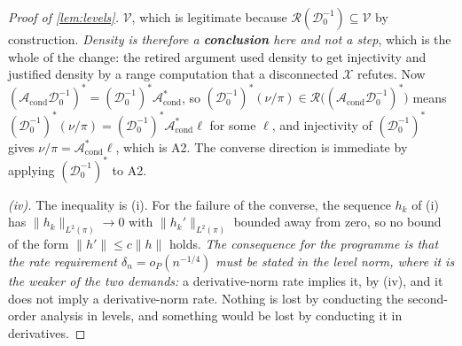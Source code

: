 \begin{proof}[Proof of \cref{lem:levels}]
$\mathcal V$, which is legitimate because $\mathcal R(\mathcal D^{-1}_0)\subseteq\mathcal V$ by
construction. \emph{Density is therefore a \textbf{conclusion} here and not a step}, which is the whole
of the change: the retired argument used density to get injectivity and justified density by a range
computation that a disconnected $\mathcal X$ refutes. Now
$(\mathcal A_{\mathrm{cond}}\mathcal D^{-1}_0)^{\ast}=(\mathcal D^{-1}_0)^{\ast}\mathcal A^\ast_{\mathrm{cond}}$,
so
$(\mathcal D^{-1}_0)^{\ast}(\nu/\pi)\in\mathcal R\big((\mathcal A_{\mathrm{cond}}\mathcal D^{-1}_0)^{\ast}\big)$
means $(\mathcal D^{-1}_0)^{\ast}(\nu/\pi)=(\mathcal D^{-1}_0)^{\ast}\mathcal A^\ast_{\mathrm{cond}}\ell$
for some $\ell$, and injectivity of $(\mathcal D^{-1}_0)^{\ast}$ gives
$\nu/\pi=\mathcal A^\ast_{\mathrm{cond}}\ell$, which is A2. The converse direction is immediate by
applying $(\mathcal D^{-1}_0)^{\ast}$ to A2.

\emph{(iv).} The inequality is (i). For the failure of the converse, the sequence $h_k$ of (i) has
$\|h_k\|_{L^{2}(\pi)}\to0$ with $\|h_k'\|_{L^{2}(\pi)}$ bounded away from zero, so no bound of the form
$\|h'\|\le c\|h\|$ holds. \emph{The consequence for the programme is that the rate requirement
$\delta_n=o_P(n^{-1/4})$ must be stated in the level norm, where it is the weaker of the two demands:} a
derivative-norm rate implies it, by (iv), and it does not imply a derivative-norm rate. Nothing is lost
by conducting the second-order analysis in levels, and something would be lost by conducting it in
derivatives.
\end{proof}

